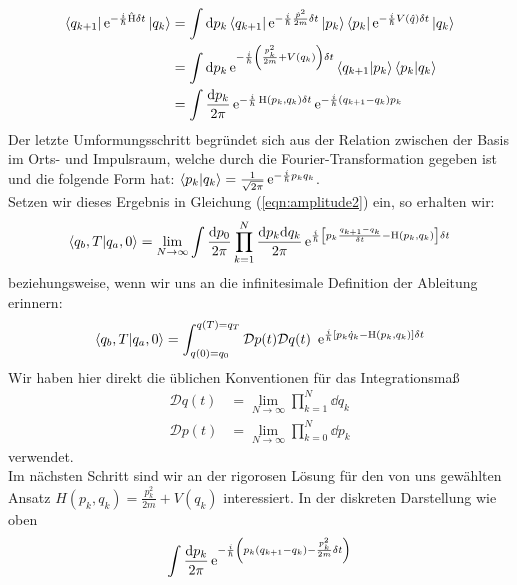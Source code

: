 \begin{align}
	\bra{q_{k+1}}\operatorname{e}^{-\frac{i}{\hbar}\hat{\operatorname{H}}\delta t}\ket{q_k} &= \int \dd p_k \bra{q_{k+1}}\operatorname{e}^{-\frac{i}{\hbar}\frac{\hat{p}^2}{2m}\delta t}\ket{p_k}\bra{p_k}\operatorname{e}^{-\frac{i}{\hbar} V(\hat{q})\delta t}\ket{q_k} \nonumber \\
	&= \int \dd p_k \operatorname{e}^{-\frac{i}{\hbar}\left(\frac{p_k^2}{2m} +V(q_k)\right)\delta t}\bra{q_{k+1}}\ket{p_k}\bra{p_k}\ket{q_k} \nonumber \\
	&= \int \frac{\dd p_k}{2\pi} \operatorname{e}^{-\frac{i}{\hbar} \operatorname{H}(p_k,q_k)\delta t} \operatorname{e}^{-\frac{i}{\hbar}(q_{k+1}-q_k)p_k}
\end{align}
Der letzte Umformungsschritt begründet sich aus der Relation zwischen der Basis im Orts- und Impulsraum, welche durch die Fourier-Transformation gegeben ist und die folgende Form hat: $\braket{p_k}{q_k} = \frac{1}{\sqrt{2\pi}} \operatorname{e}^{-\frac{i}{\hbar} p_kq_k}$. \\
Setzen wir dieses Ergebnis in Gleichung (\ref{eqn:amplitude2}) ein, so erhalten wir: 
\begin{align}
	\braket{q_b,T}{q_a,0} = \lim_{N\rightarrow\infty} \int \frac{\dd p_0}{2\pi} \prod_{k=1}^N \frac{\dd p_k\dd q_k}{2\pi} \operatorname{e}^{\frac{i}{\hbar}\left[p_k\frac{q_{k+1}-q_k}{\delta t} - \operatorname{H}(p_k,q_k)\right]\delta t}
\end{align}
beziehungsweise, wenn wir uns an die infinitesimale Definition der Ableitung erinnern:
\begin{align}
	\braket{q_b,T}{q_a,0} = \int_{q(0)=q_0}^{q(T)=q_T} \mathcal{D}p(t)\mathcal{D}q(t) \ \operatorname{e}^{\ihbar\left[p_k\dot{q}_k - \operatorname{H}(p_k,q_k)\right]\delta t}
\end{align}
Wir haben hier direkt die üblichen Konventionen für das Integrationsmaß
\begin{align*}
	\mathcal{D}q(t) &= \lim_{N\rightarrow\infty} \prod_{k=1}^{N} \dd q_k \\
	\mathcal{D}p(t) &= \lim_{N\rightarrow\infty} \prod_{k=0}^{N} \dd p_k
\end{align*}
verwendet. \\ 
Im nächsten Schritt sind wir an der rigorosen Lösung für den von uns gewählten Ansatz $H(p_k,q_k) = \frac{p_k^2}{2m} + V(q_k)$ interessiert. In der diskreten Darstellung wie oben
\begin{align}
	\int\frac{\dd p_k}{2\pi} \operatorname{e}^{-\frac{i}{\hbar}\left(p_k(q_{k+1}-q_k)-\frac{p_k^2}{2m}\delta t\right)} \label{eqn:gauss}
\end{align}
